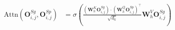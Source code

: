 




\newcommand{\vect}[1]{\mathbf{#1}}
\newcommand{\sg}{\vect{O}^{Sg}_{i, j}}
\newcommand{\spsp}{\vect{O}^{Sp}_{i, j}}
\newcommand{\whk}{\mathbf{W}^K_h}
\newcommand{\whq}{\mathbf{W}^Q_h}
\newcommand{\whv}{\mathbf{W}^V_h}
\newcommand{\dk}{\sqrt{d_k}}

\begin{align}
\text{Attn}(\sg, \spsp) &= \sigma\left(\frac{(\whk \sg) \cdot (\whq \spsp)^\top}{\dk} \whv \sg\right) \label{eq16}
\end{align}
